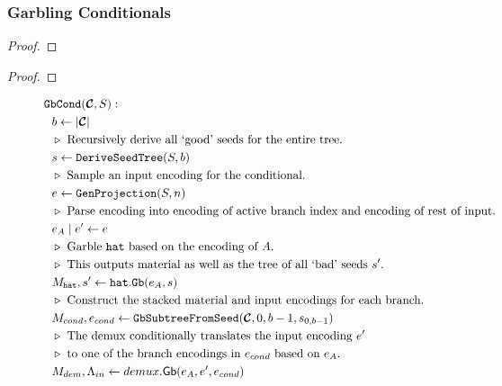 \subsubsection{Garbling Conditionals}

\begin{lemma}\label{lemma:gbcondtime}
\end{lemma}
\begin{proof}
\end{proof}

\begin{lemma}\label{lemma:gbcondspace}
\end{lemma}
\begin{proof}
\end{proof}

\begin{figure}
  \begin{align*}
    &\gbcond(\vec{\cir}, S):\\
    &~~b \gets | \vec{\cir} |\\
    &~~\codecomment{Recursively derive all `good' seeds for the entire tree.}\\
    &~~s \gets \mathtt{DeriveSeedTree}(S, b)\\
    &~~\codecomment{Sample an input encoding for the conditional.}\\
    &~~e \gets \genprojection(S, n)\\
    &~~\codecomment{Parse encoding into encoding of active branch
    index and encoding of rest of input.}\\
    &~~e_\aid\mid e' \gets e\\
    &~~\codecomment{Garble \gadget\ based on the encoding of \aid.}\\
    &~~\codecomment{This outputs material as well as the tree of all
    `bad' seeds $s'$.}\\
    &~~\mat_\gadget, s' \gets \gadget.\mathtt{Gb}(e_\aid, s)\\
    &~~\codecomment{Construct the stacked material and input encodings for each branch.}\\
    &~~M_{cond}, e_{cond} \gets \gbtree(\vec{\cir}, 0, b-1, s_{0, b-1})\\
    &~~\codecomment{The demux conditionally translates the input encoding $e'$}\\ 
    &~~\codecomment{to one of the branch encodings in $e_{cond}$ based on $e_\aid$.}\\
    &~~\mat_{dem}, \Lambda_{in} \gets \gbdem(e_\aid, e', e_{cond})\\

\end{align*}
\end{figure}
